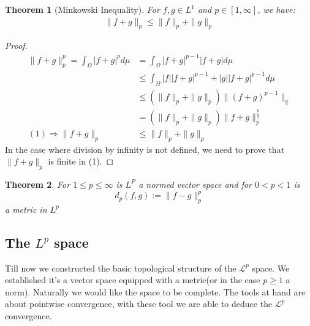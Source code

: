 \documentclass[a4paper,11pt,oneside,fleqn]{book}
\newtheorem{theorem}{Theorem}[section]
\theoremstyle{definition}
\theoremstyle{remark}
\begin{document}
\begin{theorem}[Minkowski Inequality]
	For $f, g \in L^1$ and $p \in [1, \infty]$, we have:
	\begin{align*}
		\| f + g \|_p \leq \|f\|_p + \|g\|_p
	\end{align*}
\end{theorem}
\begin{proof}
	\begin{align*}
		\|f + g\|^p_p =
		\int_\Omega |f + g|^p d\mu &= \int_\Omega |f+g|^{p-1} |f + g| d\mu \\
		&\leq \int_\Omega |f| |f+g|^{p-1} + |g| |f+g|^{p-1} d\mu \\
		&\leq (\|f\|_p + \|g\|_p) \|(f + g)^{p-1}\|_q\\
		&= (\|f\|_p + \|g\|_p) \|f + g\|_p^{\frac{p}{q}}\\
		(1)\Rightarrow
		\|f + g\|_p &\leq \|f\|_p + \|g\|_p
	\end{align*}
	In the case where division by infinity is not defined, we need to prove that $\|f + g\|_p$ is finite in (1).
\end{proof}

\begin{theorem}
	For $1 \leq p \leq \infty$ is $L^P$ a normed vector space and for $0 < p < 1$ is 
	\begin{equation*}
		d_p(f, g) := \|f - g\|^p_p
	\end{equation*}
	a metric in $L^p$
\end{theorem}


\subsection{The $L^p$ space}
Till now we constructed the basic topological structure of the $\mathcal{L}^p$ space. We established it's a vector space equipped with a metric(or in the case $p \geq 1$ a norm). Naturally we would like the space to be complete. The tools at hand are about pointwise convergence, with these tool we are able to deduce the $\mathcal{L}^p$ convergence.  
\end{document}
